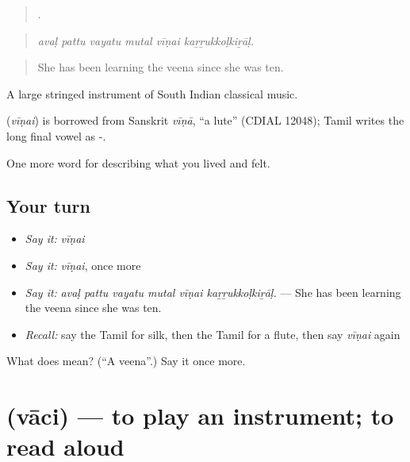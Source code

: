 \begin{quote}
     .
\end{quote}

\begin{quote}
\emph{avaḷ pattu vayatu mutal vīṇai kaṟṟukkoḷkiṟāḷ.}
\end{quote}

\begin{quote}
She has been learning the veena since she was ten.
\end{quote}

A large stringed instrument of South Indian classical music.

\begin{cousinweb}
\textbf{} (\emph{vīṇai}) is borrowed from Sanskrit \emph{vīṇā}, \textquotedblleft{}a lute\textquotedblright{} (CDIAL 12048); Tamil writes the long final vowel as -.
\end{cousinweb}

\begin{grammarlens}[title={What you've built}]
One more word for describing what you lived and felt.
\end{grammarlens}

\subsection*{Your turn}
\begin{itemize}
\raggedright
  \item \emph{Say it:} \emph{vīṇai}
  \item \emph{Say it:} \emph{vīṇai}, once more
  \item \emph{Say it:} \emph{avaḷ pattu vayatu mutal vīṇai kaṟṟukkoḷkiṟāḷ.} — She has been learning the veena since she was ten.
  \item \emph{Recall:} say the Tamil for silk, then the Tamil for a flute, then say \emph{vīṇai} again
\end{itemize}

\begin{tcolorbox}[breakable,colback=teal!4,colframe=teal!35!black,title={Before you move on}]
What does  mean? (\textquotedblleft{}A veena\textquotedblright{}.) Say it once more.
\end{tcolorbox}
\section[\texorpdfstring{\ta{வாசி} (vāci)}{வாசி (vāci)}]{ (vāci) — to play an instrument; to read aloud}

